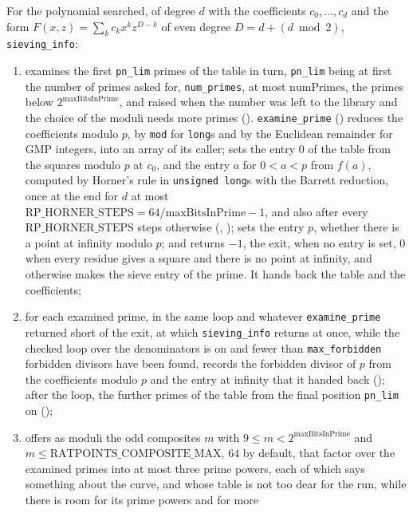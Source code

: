 For the polynomial searched, of degree $d$ with the coefficients $c_0, \dots, c_d$ and the form
$F(x, z) = \sum_k c_k x^k z^{D - k}$ of even degree $D = d + (d \bmod 2)$, \verb|sieving_info|:
\begin{enumerate}
  \item examines the first \verb|pn_lim| primes of the table in turn, \verb|pn_lim| being at first
    the number of primes asked for, \verb|num_primes|, at most $\mathrm{numPrimes}$, the primes
    below $2^{\mathrm{maxBitsInPrime}}$, and raised when the number was left to the library and the
    choice of the moduli needs more primes ().
    \verb|examine_prime| () reduces the coefficients modulo $p$,
    by \verb|mod| for \verb|long|s and by the Euclidean remainder for GMP integers, into an array of
    its caller; sets the entry $0$ of the table from the squares modulo $p$ at $c_0$, and the entry
    $a$ for $0 < a < p$ from $f(a)$, computed by Horner's rule in \verb|unsigned long|s with the
    Barrett reduction, once at the end for $d$ at most
    $\mathrm{RP\_HORNER\_STEPS} = 64 / \mathrm{maxBitsInPrime} - 1$, and also after every
    $\mathrm{RP\_HORNER\_STEPS}$ steps otherwise (,
    ); sets the entry $p$, whether there is a point at infinity
    modulo $p$; and returns $-1$, the exit, when no entry is set, $0$ when every residue gives a
    square and there is no point at infinity, and otherwise makes the sieve entry of the prime. It
    hands back the table and the coefficients;
  \item for each examined prime, in the same loop and whatever \verb|examine_prime| returned short
    of the exit, at which \verb|sieving_info| returns at once, while the checked loop over the
    denominators is on and fewer than \verb|max_forbidden| forbidden divisors have been found,
    records the forbidden divisor of $p$ from the coefficients modulo $p$ and the entry at infinity
    that it handed back (); after the loop, the further primes of
    the table from the final position \verb|pn_lim| on ();
  \item offers as moduli the odd composites $m$ with $9 \le m < 2^{\mathrm{maxBitsInPrime}}$ and
    $m \le \mathrm{RATPOINTS\_COMPOSITE\_MAX}$, $64$ by default, that factor over the examined
    primes into at most three prime powers, each of which says something about the curve, and whose
    table is not too dear for the run, while there is room for its prime powers and for more

\end{enumerate}
